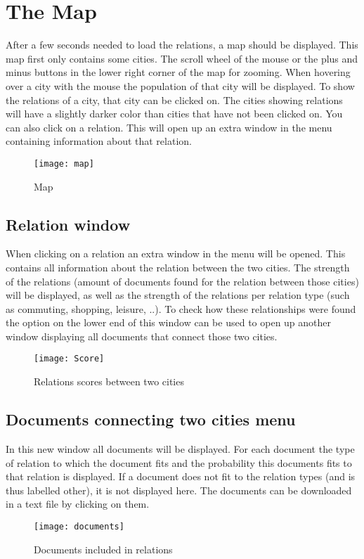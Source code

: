 \section{The Map}
After a few seconds needed to load the relations, a map should be displayed. This map first only contains some cities. The scroll wheel of the mouse or the plus and minus buttons in the lower right corner of the map for zooming. When hovering over a city with the mouse the population of that city will be displayed. To show the relations of a city, that city can be clicked on. The cities showing relations will have a slightly darker color than cities that have not been clicked on. You can also click on a relation. This will open up an extra window in the menu containing information about that relation.

\begin{figure}[H]
    \centering
    \texttt{[image: map]}
    \caption{Map}
    \label{fig:infoflow}
\end{figure}





\subsection{Relation window}
When clicking on a relation an extra window in the menu will be opened. This contains all information about the relation between the two cities. The strength of the relations (amount of documents found for the relation between those cities) will be displayed, as well as the strength of the relations per relation type (such as commuting, shopping, leisure, ..). To check how these relationships were found the option on the lower end of this window  can be used to open up another window displaying all documents that connect those two cities.

\begin{figure}[H]
    \centering
    \texttt{[image: Score]}
    \caption{Relations scores between two cities}
    \label{fig:infoflow}
\end{figure}


\subsection{Documents connecting two cities menu}
In this new window all documents will be displayed. For each document the type of relation to which the document fits and the probability this documents fits to that relation is displayed. If a document does not fit to the relation types (and is thus labelled other), it is not displayed here. The documents can be downloaded in a text file by clicking on them.

\begin{figure}[H]
    \centering
    \texttt{[image: documents]}
    \caption{Documents included in relations}
    \label{fig:infoflow}
\end{figure}

